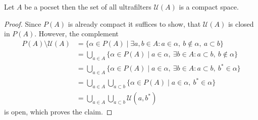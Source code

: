 

\begin{prop}
  Let \(A\) be a pocset then the set of all ultrafilters \(\mathcal{U}(A)\) is a compact space.
\end{prop}

\begin{proof}
  Since \(P(A)\) is already compact it suffices to show, that \(\mathcal{U}(A)\) is closed in \(P(A)\). However, the complement
  \begin{align*}
    P(A) \setminus \mathcal{U}(A)
    & = \{\alpha \in P(A) \mid \exists a, b \in A\colon a \in \alpha,\ b \notin \alpha,\ a \subset b\}\\
    & = \bigcup_{a \in A} \{\alpha \in P(A) \mid a \in \alpha,\ \exists b \in A\colon a \subset b,\ b \notin \alpha\}\\
    & = \bigcup_{a \in A} \{\alpha \in P(A) \mid a \in \alpha,\ \exists b \in A\colon a \subset b,\ b^\ast \in \alpha\}\\
    & = \bigcup_{a \in A} \bigcup_{a \subset b}\{\alpha \in P(A) \mid a \in \alpha,\ b^\ast \in \alpha\}\\
    & = \bigcup_{a \in A} \bigcup_{a \subset b}\mathcal{U}(a, b^\ast)
  \end{align*}
  is open, which proves the claim.
\end{proof}

